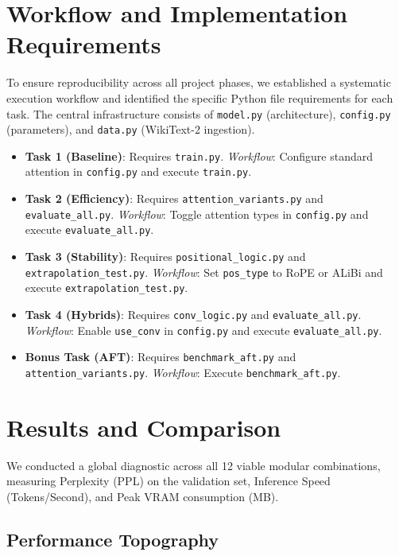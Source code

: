 \documentclass[11pt,a4paper]{article}
\begin{document}
\section{Workflow and Implementation Requirements}

To ensure reproducibility across all project phases, we established a systematic execution workflow and identified the specific Python file requirements for each task. The central infrastructure consists of \texttt{model.py} (architecture), \texttt{config.py} (parameters), and \texttt{data.py} (WikiText-2 ingestion).

\begin{itemize}
    \item \textbf{Task 1 (Baseline)}: Requires \texttt{train.py}. \textit{Workflow}: Configure standard attention in \texttt{config.py} and execute \texttt{train.py}.
    \item \textbf{Task 2 (Efficiency)}: Requires \texttt{attention\_variants.py} and \texttt{evaluate\_all.py}. \textit{Workflow}: Toggle attention types in \texttt{config.py} and execute \texttt{evaluate\_all.py}.
    \item \textbf{Task 3 (Stability)}: Requires \texttt{positional\_logic.py} and \texttt{extrapolation\_test.py}. \textit{Workflow}: Set \texttt{pos\_type} to RoPE or ALiBi and execute \texttt{extrapolation\_test.py}.
    \item \textbf{Task 4 (Hybrids)}: Requires \texttt{conv\_logic.py} and \texttt{evaluate\_all.py}. \textit{Workflow}: Enable \texttt{use\_conv} in \texttt{config.py} and execute \texttt{evaluate\_all.py}.
    \item \textbf{Bonus Task (AFT)}: Requires \texttt{benchmark\_aft.py} and \texttt{attention\_variants.py}. \textit{Workflow}: Execute \texttt{benchmark\_aft.py}.
\end{itemize}

\section{Results and Comparison}

We conducted a global diagnostic across all 12 viable modular combinations, measuring Perplexity (PPL) on the validation set, Inference Speed (Tokens/Second), and Peak VRAM consumption (MB).

\subsection{Performance Topography}
\end{document}
